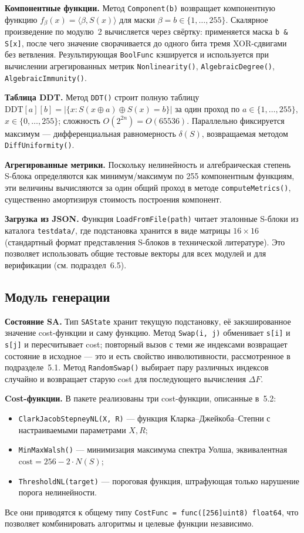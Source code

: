 \textbf{Компонентные функции.} Метод \texttt{Component(b)}
возвращает компонентную функцию $f_\beta(x) = \langle \beta, S(x) \rangle$
для маски $\beta = b \in \{1, \dots, 255\}$. Скалярное произведение
по модулю~2 вычисляется через свёртку: применяется маска
\texttt{b \& S[x]}, после чего значение сворачивается до одного бита
тремя XOR-сдвигами без ветвления. Результирующая
\texttt{BoolFunc} кэшируется и используется при вычислении
агрегированных метрик \texttt{Nonlinearity()},
\texttt{AlgebraicDegree()}, \texttt{AlgebraicImmunity()}.

\textbf{Таблица DDT.} Метод \texttt{DDT()} строит полную таблицу
$\mathrm{DDT}[a][b] = |\{x : S(x \oplus a) \oplus S(x) = b\}|$ за
один проход по $a \in \{1, \dots, 255\}$, $x \in \{0, \dots, 255\}$;
сложность $O(2^{2n}) = O(65536)$. Параллельно фиксируется максимум —
дифференциальная равномерность $\delta(S)$, возвращаемая методом
\texttt{DiffUniformity()}.

\textbf{Агрегированные метрики.} Поскольку нелинейность и
алгебраическая степень S-блока определяются как минимум/максимум
по 255 компонентным функциям, эти величины вычисляются за один
общий проход в методе \texttt{computeMetrics()}, существенно
амортизируя стоимость построения компонент.

\textbf{Загрузка из JSON.} Функция \texttt{LoadFromFile(path)}
читает эталонные S-блоки из каталога \texttt{testdata/}, где
подстановка хранится в виде матрицы $16 \times 16$
(стандартный формат представления S-блоков в технической
литературе). Это позволяет использовать общие тестовые векторы
для всех модулей и для верификации (см. подраздел~6.5).

\subsection{Модуль генерации}

\textbf{Состояние SA.} Тип \texttt{SAState} хранит текущую
подстановку, её закэшированное значение cost-функции и саму
функцию. Метод \texttt{Swap(i, j)} обменивает \texttt{s[i]} и
\texttt{s[j]} и пересчитывает cost; повторный вызов с теми же
индексами возвращает состояние в исходное — это и есть свойство
инволютивности, рассмотренное в подразделе~5.1. Метод
\texttt{RandomSwap()} выбирает пару различных индексов случайно и
возвращает старую cost для последующего вычисления $\Delta F$.

\textbf{Cost-функции.} В пакете реализованы три cost-функции,
описанные в~5.2:
\begin{itemize}
    \item \texttt{ClarkJacobStepneyNL(X, R)} — функция
        Кларка–Джейкоба–Степни с настраиваемыми параметрами
        $X, R$;
    \item \texttt{MinMaxWalsh()} — минимизация максимума спектра
        Уолша, эквивалентная $\mathrm{cost} = 256 - 2 \cdot N(S)$;
    \item \texttt{ThresholdNL(target)} — пороговая функция,
        штрафующая только нарушение порога нелинейности.
\end{itemize}
Все они приводятся к общему типу
\texttt{CostFunc = func([256]uint8) float64}, что позволяет
комбинировать алгоритмы и целевые функции независимо.


